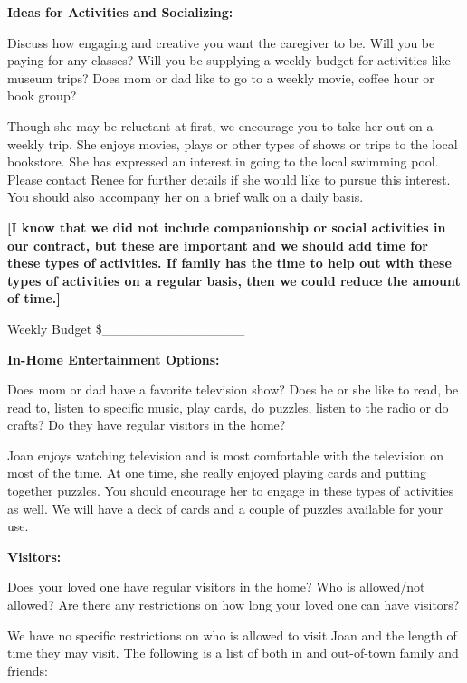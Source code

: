 \documentclass[]{article}
\begin{document}
\textbf{Ideas for Activities and Socializing:}

Discuss how engaging and creative you want the caregiver to be. Will you
be paying for any classes? Will you be supplying a weekly budget for
activities like museum trips? Does mom or dad like to go to a weekly
movie, coffee hour or book group?

Though she may be reluctant at first, we encourage you to take her out
on a weekly trip. She enjoys movies, plays or other types of shows or
trips to the local bookstore. She has expressed an interest in going to
the local swimming pool. Please contact Renee for further details if she
would like to pursue this interest. You should also accompany her on a
brief walk on a daily basis.

\textbf{{[}I know that we did not include companionship or social
activities in our contract, but these are important and we should add
time for these types of activities. If family has the time to help out
with these types of activities on a regular basis, then we could reduce
the amount of time.{]}}

Weekly Budget \$\_\_\_\_\_\_\_\_\_\_\_\_\_\_\_

\textbf{In-Home Entertainment Options:}

Does mom or dad have a favorite television show? Does he or she like to
read, be read to, listen to specific music, play cards, do puzzles,
listen to the radio or do crafts? Do they have regular visitors in the
home?

Joan enjoys watching television and is most comfortable with the
television on most of the time. At one time, she really enjoyed playing
cards and putting together puzzles. You should encourage her to engage
in these types of activities as well. We will have a deck of cards and a
couple of puzzles available for your use.

\textbf{Visitors:}

Does your loved one have regular visitors in the home? Who is
allowed/not allowed? Are there any restrictions on how long your loved
one can have visitors?

We have no specific restrictions on who is allowed to visit Joan and the
length of time they may visit. The following is a list of both in and
out-of-town family and friends:
\end{document}
